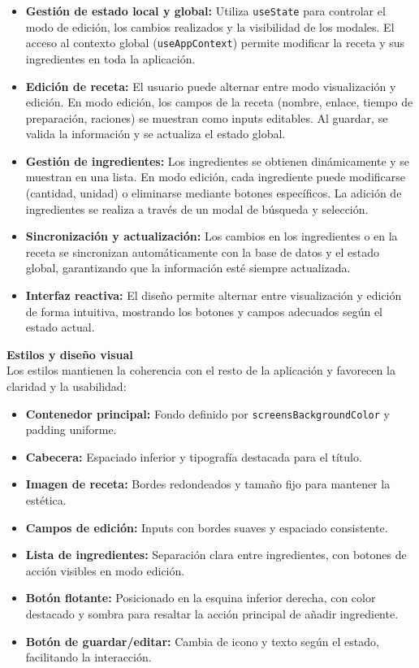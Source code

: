\documentclass[twoside, openright, 11pt]{report}
\begin{document}
				\begin{itemize}
					\item \textbf{Gestión de estado local y global:} Utiliza \texttt{useState} para controlar el modo de edición, los cambios realizados y la visibilidad de los modales. El acceso al contexto global (\texttt{useAppContext}) permite modificar la receta y sus ingredientes en toda la aplicación.
					\item \textbf{Edición de receta:} El usuario puede alternar entre modo visualización y edición. En modo edición, los campos de la receta (nombre, enlace, tiempo de preparación, raciones) se muestran como inputs editables. Al guardar, se valida la información y se actualiza el estado global.
					\item \textbf{Gestión de ingredientes:} Los ingredientes se obtienen dinámicamente y se muestran en una lista. En modo edición, cada ingrediente puede modificarse (cantidad, unidad) o eliminarse mediante botones específicos. La adición de ingredientes se realiza a través de un modal de búsqueda y selección.
					\item \textbf{Sincronización y actualización:} Los cambios en los ingredientes o en la receta se sincronizan automáticamente con la base de datos y el estado global, garantizando que la información esté siempre actualizada.
					\item \textbf{Interfaz reactiva:} El diseño permite alternar entre visualización y edición de forma intuitiva, mostrando los botones y campos adecuados según el estado actual.
				\end{itemize}
				
				\textbf{Estilos y diseño visual}\\
				Los estilos mantienen la coherencia con el resto de la aplicación y favorecen la claridad y la usabilidad:
				
				\begin{itemize}
					\item \textbf{Contenedor principal:} Fondo definido por \texttt{screensBackgroundColor} y padding uniforme.
					\item \textbf{Cabecera:} Espaciado inferior y tipografía destacada para el título.
					\item \textbf{Imagen de receta:} Bordes redondeados y tamaño fijo para mantener la estética.
					\item \textbf{Campos de edición:} Inputs con bordes suaves y espaciado consistente.
					\item \textbf{Lista de ingredientes:} Separación clara entre ingredientes, con botones de acción visibles en modo edición.
					\item \textbf{Botón flotante:} Posicionado en la esquina inferior derecha, con color destacado y sombra para resaltar la acción principal de añadir ingrediente.
					\item \textbf{Botón de guardar/editar:} Cambia de icono y texto según el estado, facilitando la interacción.
				\end{itemize}
				
\end{document}
